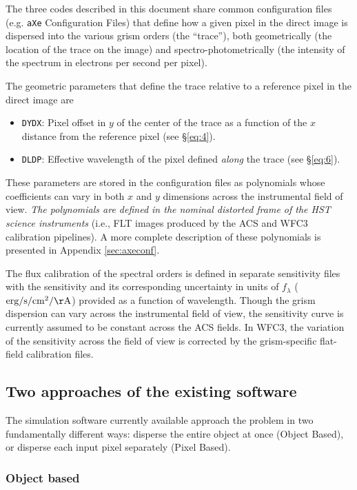 \documentclass[preprint]{aastex}
\begin{document}
The three codes described in this document share common configuration files (e.g. \texttt{aXe} Configuration Files) that define how a given pixel in the direct image is dispersed into the various grism orders (the ``trace''), both geometrically (the location of the trace on the image) and spectro-photometrically (the intensity of the spectrum in electrons per second per pixel). 

The geometric parameters that define the trace relative to a reference pixel in the direct image are 
\begin{itemize}
    \item \texttt{DYDX}: Pixel offset in $y$ of the center of the trace as a function of the $x$ distance from the reference pixel (see \S\ref{eq:4}).
    
    \item \texttt{DLDP}: Effective wavelength of the pixel defined \textit{along} the trace (see \S\ref{eq:6}). 
\end{itemize}

These parameters are stored in the configuration files as polynomials whose coefficients can vary in both $x$ and $y$ dimensions across the instrumental field of view.  \textit{The polynomials are defined in the nominal distorted frame of the \textit{HST} science instruments} (i.e., FLT images produced by the ACS and WFC3 calibration pipelines). A more complete description of these polynomials is presented in Appendix \ref{sec:axeconf}.

The flux calibration of the spectral orders is defined in separate sensitivity files with the sensitivity and its corresponding uncertainty in units of $f_\lambda$ ($\mathrm{erg/s/cm^2/\AA}$) provided as a function of wavelength.  Though the grism dispersion can vary across the instrumental field of view, the sensitivity curve is currently assumed to be constant across the ACS fields. In WFC3, the variation of the sensitivity across the field of view is corrected by the grism-specific flat-field calibration files.

\subsection{Two approaches of the existing software}
The simulation software currently available approach the problem in two fundamentally different ways: disperse the entire object at once (Object Based), or disperse each input pixel separately (Pixel Based).

\subsubsection{Object based}
\end{document}
